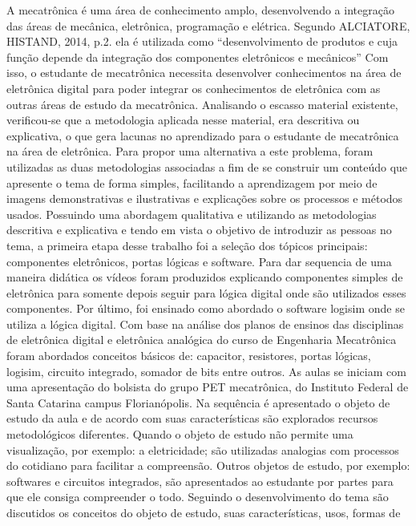 A mecatrônica é uma área de conhecimento amplo, desenvolvendo a integração das áreas 
de mecânica, eletrônica, programação e elétrica. Segundo ALCIATORE, HISTAND, 2014, p.2. 
ela é utilizada como “desenvolvimento de produtos e cuja função depende da integração dos 
componentes eletrônicos e mecânicos” 
Com isso, o estudante de mecatrônica necessita desenvolver conhecimentos na área de 
eletrônica digital para poder integrar os conhecimentos de eletrônica com as outras áreas de 
estudo da mecatrônica.
Analisando o escasso material existente, verificou-se que a metodologia aplicada nesse material, 
era descritiva ou explicativa, o que gera lacunas no aprendizado para o estudante de mecatrônica 
na área de eletrônica. 
Para propor uma alternativa a este problema, foram utilizadas as duas metodologias 
associadas a fim de se construir um conteúdo que apresente o tema de forma simples, facilitando 
a aprendizagem por meio de imagens demonstrativas e ilustrativas e explicações sobre os 
processos e métodos usados.
Possuindo uma abordagem qualitativa e utilizando as metodologias descritiva e 
explicativa e tendo em vista o objetivo de introduzir as pessoas no tema, a primeira etapa desse 
trabalho foi a seleção dos tópicos principais: componentes eletrônicos, portas lógicas e software. 
Para dar sequencia de uma maneira didática os vídeos foram produzidos explicando 
componentes simples de eletrônica para somente depois seguir para lógica digital onde são 
utilizados esses componentes. Por último, foi ensinado como abordado o software logisim onde 
se utiliza a lógica digital. 
Com base na análise dos planos de ensinos das disciplinas de eletrônica digital e 
eletrônica analógica do curso de Engenharia Mecatrônica foram abordados conceitos básicos de: 
capacitor, resistores, portas lógicas, logisim, circuito integrado, somador de bits entre outros.
As aulas se iniciam com uma apresentação do bolsista do grupo PET mecatrônica, do 
Instituto Federal de Santa Catarina campus Florianópolis. Na sequência é apresentado o objeto 
de estudo da aula e de acordo com suas características são explorados recursos metodológicos 
diferentes. Quando o objeto de estudo não permite uma visualização, por exemplo: a 
eletricidade; são utilizadas analogias com processos do cotidiano para facilitar a compreensão. 
Outros objetos de estudo, por exemplo: softwares e circuitos integrados, são apresentados ao 
estudante por partes para que ele consiga compreender o todo. Seguindo o desenvolvimento do 
tema são discutidos os conceitos do objeto de estudo, suas características, usos, formas de 
